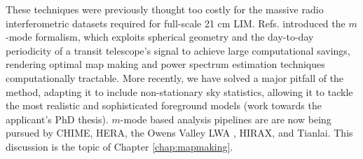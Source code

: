 These techniques were previously thought too costly for the massive radio interferometric datasets required for full-scale 21 cm LIM. Refs. \citep{mmodes1, mmodes2} introduced the $m$-mode formalism, which exploits spherical geometry and the day-to-day periodicity of a transit telescope's signal to achieve large computational savings, rendering optimal map making and power spectrum estimation techniques computationally tractable. More recently, we have solved a major pitfall of the method, adapting it to include non-stationary sky statistics, allowing it to tackle the most realistic and sophisticated foreground models \citep{bergeroppermann} (work towards the applicant's PhD thesis). $m$-mode based analysis pipelines are are now being pursued by CHIME, HERA, the Owens Valley LWA \citep{eastwoodetal}, HIRAX, and Tianlai. This discussion is the topic of Chapter \ref{chap:mapmaking}.